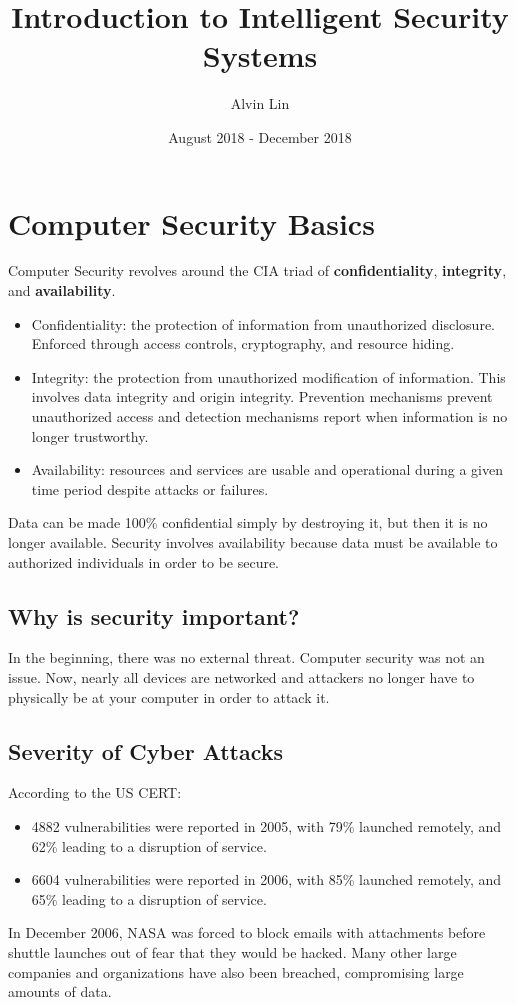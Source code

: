\documentclass{math}
\title{Introduction to Intelligent Security Systems}
\author{Alvin Lin}
\date{August 2018 - December 2018}
\begin{document}
\maketitle

\section*{Computer Security Basics}
Computer Security revolves around the CIA triad of \textbf{confidentiality},
\textbf{integrity}, and \textbf{availability}.
\begin{itemize}
  \item Confidentiality: the protection of information from unauthorized
    disclosure. Enforced through access controls, cryptography, and resource
    hiding.
  \item Integrity: the protection from unauthorized modification of information.
    This involves data integrity and origin integrity. Prevention mechanisms
    prevent unauthorized access and detection mechanisms report when information
    is no longer trustworthy.
  \item Availability: resources and services are usable and operational during
    a given time period despite attacks or failures.
\end{itemize}
Data can be made 100\% confidential simply by destroying it, but then it is
no longer available. Security involves availability because data must be
available to authorized individuals in order to be secure.

\subsection*{Why is security important?}
In the beginning, there was no external threat. Computer security was not an
issue. Now, nearly all devices are networked and attackers no longer have to
physically be at your computer in order to attack it.

\subsection*{Severity of Cyber Attacks}
According to the US CERT:
\begin{itemize}
  \item 4882 vulnerabilities were reported in 2005, with 79\% launched remotely,
    and 62\% leading to a disruption of service.
  \item 6604 vulnerabilities were reported in 2006, with 85\% launched remotely,
    and 65\% leading to a disruption of service.
\end{itemize}
In December 2006, NASA was forced to block emails with attachments before
shuttle launches out of fear that they would be hacked. Many other large
companies and organizations have also been breached, compromising large amounts
of data.
\end{document}
